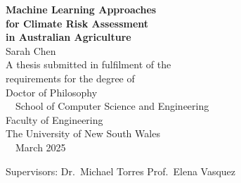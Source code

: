\documentclass[12pt,a4paper]{report}
\begin{document}
\begin{titlepage}
\vspace*{3cm}
\begin{center}
{\Huge\bfseries\color{unswnavy}Machine Learning Approaches\\[8pt]
for Climate Risk Assessment\\[8pt]
in Australian Agriculture}\\[24pt]
{\LARGE\color{darkgray}Sarah Chen}\\[8pt]
{\large\color{darkgray}A thesis submitted in fulfilment of the\\[4pt]
requirements for the degree of\\[4pt]
Doctor of Philosophy}\\[24pt]
{\large\color{darkgray}\faUniversity~~School of Computer Science and Engineering\\[4pt]
Faculty of Engineering\\[4pt]
The University of New South Wales}\\[24pt]
{\large\color{darkgray}\faCalendar~~March 2025}
\end{center}
\vfill
\begin{center}
{\color{darkgray}\small Supervisors: Dr.\ Michael Torres \hspace{1.5cm} Prof.\ Elena Vasquez}
\end{center}
\end{titlepage}










\end{document}
